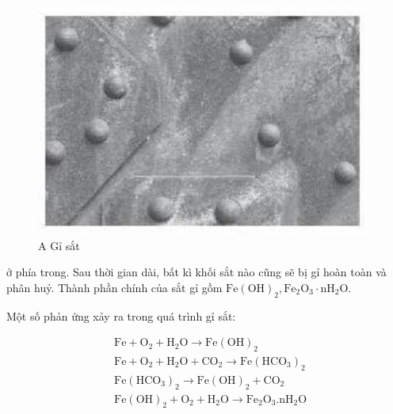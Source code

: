 \documentclass[10pt]{article}
\begin{document}
\begin{figure}[h]
\begin{center}
  \includegraphics[width=\textwidth]{2025_10_23_883c4b146e2332109fcdg-41}
\captionsetup{labelformat=empty}
\caption{A Gỉ sắt}
\end{center}
\end{figure}

ở phía trong. Sau thời gian dài, bất kì khối sắt nào cũng sẽ bị gỉ hoàn toàn và phân huỷ. Thành phần chính của sắt gỉ gồm $\mathrm{Fe}(\mathrm{OH})_{2}, \mathrm{Fe}_{2} \mathrm{O}_{3} \cdot \mathrm{nH}_{2} \mathrm{O}$.

Một số phản ứng xảy ra trong quá trình gỉ sắt:


\begin{align*}
& \mathrm{Fe}+\mathrm{O}_{2}+\mathrm{H}_{2} \mathrm{O} \rightarrow \mathrm{Fe}(\mathrm{OH})_{2}  \tag{1}\\
& \mathrm{Fe}+\mathrm{O}_{2}+\mathrm{H}_{2} \mathrm{O}+\mathrm{CO}_{2} \rightarrow \mathrm{Fe}\left(\mathrm{HCO}_{3}\right)_{2}  \tag{2}\\
& \mathrm{Fe}\left(\mathrm{HCO}_{3}\right)_{2} \rightarrow \mathrm{Fe}(\mathrm{OH})_{2}+\mathrm{CO}_{2}  \tag{3}\\
& \mathrm{Fe}(\mathrm{OH})_{2}+\mathrm{O}_{2}+\mathrm{H}_{2} \mathrm{O} \rightarrow \mathrm{Fe}_{2} \mathrm{O}_{3} . \mathrm{nH}_{2} \mathrm{O} \tag{4}
\end{align*}
\end{document}
